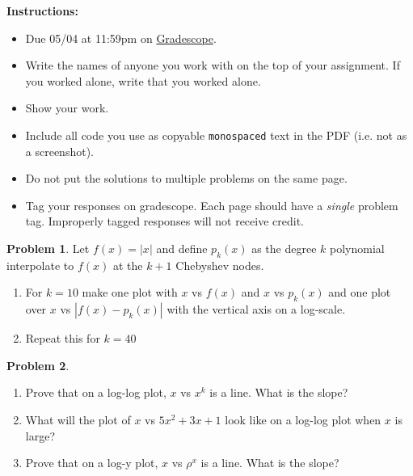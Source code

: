 \documentclass[12pt]{article}
\theoremstyle{definition}
\newtheorem{problem}{Problem}
\begin{document}
    \textbf{\Large{}}
    
    \vspace{-1.8em}
    \hrulefill
 
\textbf{Instructions:}
    \begin{itemize}
        \item Due 05/04 at 11:59pm on \href{https://www.gradescope.com/courses/487363/}{Gradescope}.
        \item Write the names of anyone you work with on the top of your assignment. If you worked alone, write that you worked alone.
        \item Show your work.
        \item Include all code you use as copyable \verb|monospaced| text in the PDF (i.e. not as a screenshot).
        \item Do not put the solutions to multiple problems on the same page.
        \item Tag your responses on gradescope. Each page should have a \emph{single} problem tag. Improperly tagged responses will not receive credit.
\end{itemize}
    
\vspace{2em}

\begin{problem}
    Let $f(x) = |x|$ and define $p_k(x)$ as the degree $k$ polynomial interpolate to $f(x)$ at the $k+1$ Chebyshev nodes. 
    \begin{enumerate}
        \item 
            For $k=10$ make one plot with $x$ vs $f(x)$ and $x$ vs $p_k(x)$  and one plot over $x$ vs $|f(x) - p_k(x)|$ with the vertical axis on a log-scale.

        \item 
            Repeat this for $k=40$


    \end{enumerate}
\end{problem}

\begin{problem}

    \begin{enumerate}
        \item Prove that on a log-log plot, $x$ vs $x^k$ is a line. What is the slope?
        \item What will the plot of $x$ vs $5x^2 + 3x + 1$ look like on a log-log plot when $x$ is large?
        \item Prove that on a log-y plot, $x$ vs $\rho^x$ is a line. What is the slope?
    \end{enumerate}

\end{problem}
\end{document}
